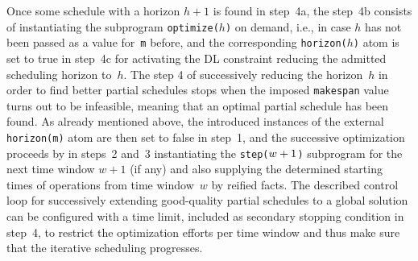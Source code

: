 \documentclass{tlp} %
\newcommand{\clingodl}{\emph{clingo}[DL]\xspace}
\begin{document}
%
Once some schedule with a horizon $h+1$ is found in step~4a,
the step~4b consists of instantiating
the subprogram \lstinline{optimize(}$h$\lstinline{)} %
on demand, i.e.,
in case $h$ has not been passed as a value for~\lstinline{m} before, and
the corresponding \lstinline{horizon(}$h$\lstinline{)} atom is set to true in step~4c for activating the DL
constraint reducing the admitted scheduling horizon to~$h$.
The step 4 of successively reducing the horizon~$h$ in order to find better partial schedules
stops when the imposed \lstinline{makespan} value turns out to be infeasible,
meaning that an optimal partial schedule has been found.
As already mentioned above, the introduced instances of the external \lstinline{horizon(m)} atom
are then set to false in step~1, and the successive optimization proceeds by in steps~2 and~3 instantiating the
\lstinline{step(}$w+\nolinebreak1$\lstinline{)} subprogram for the next time window $w+1$ (if any) and
also supplying the determined starting times of operations from time window~$w$
by reified facts.
The described control loop for successively extending good-quality partial schedules to
a global solution 
can be configured with a time limit,
included as secondary stopping condition in step~4,
to restrict the optimization efforts per time window
and thus make sure that the iterative scheduling progresses.

\end{document}
